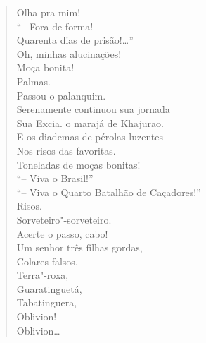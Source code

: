 \begin{verse}
Olha pra mim!\\
``-- Fora de forma!\\
Quarenta dias de prisão!\ldots{}''\\
\qquad\qquad\qquad\quad Oh, minhas alucinações!\\
Moça bonita!\\
Palmas.\\
Passou o palanquim.\\
Serenamente continuou sua jornada\\
Sua Excia. o marajá de Khajurao.\\
E os diademas de pérolas luzentes\\
Nos risos das favoritas.\\
Toneladas de moças bonitas!\\
\qquad\quad ``-- Viva o Brasil!''\\
\qquad\qquad\quad ``-- Viva o Quarto Batalhão de Caçadores!''\\
Risos.\\
Sorveteiro"-sorveteiro.\\
Acerte o passo, cabo!\\
Um senhor três filhas gordas,\\
\qquad\qquad\qquad\quad Colares falsos,\\
\qquad\qquad\qquad Terra"-roxa,\\
\qquad\qquad\quad Guaratinguetá,\\
\qquad\qquad Tabatinguera,\\
\qquad\quad Oblivion!\\
\qquad Oblivion\ldots{}


\end{verse}
